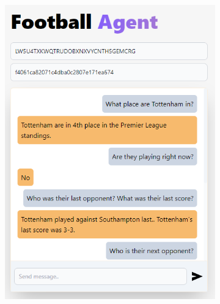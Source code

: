 \documentclass[10pt,a4paper,twocolumn]{article}
\begin{document}
\begin{figure}
    \centering
    \begin{subfigure}[b]{0.48\textwidth}
        \centering
        \includegraphics[width=\textwidth]{assets/Screenshot_11.png}
    \end{subfigure}
    \hfill
    \begin{subfigure}[b]{0.48\textwidth}
        \centering

\end{subfigure}
\end{figure}
\end{document}
